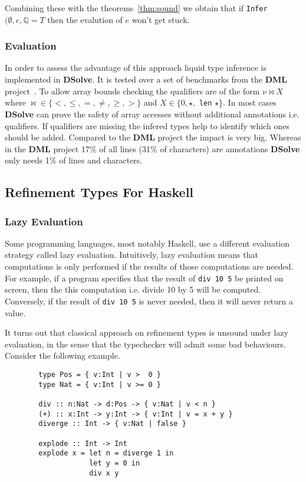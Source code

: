 \documentclass[a4paper,UKenglish]{lipics-v2016}
\begin{document}
Combining these with the theorems~\ref{thm:sound} we obtain that if \lstinline{Infer}$(\emptyset, e, \mathbb{Q} = T$ then the evalution of $e$ won't get stuck.

\subsubsection{Evaluation}

In order to assess the advantage of this approach liquid type inference is implemented in \textbf{DSolve}.
It is tested over a set of benchmarks from the \textbf{DML} project~\cite{Xi:1998:EAB}.
To allow array bounds checking the qualifiers are of the form $\nu \bowtie X$ where $\bowtie \in \{<, \le, =, \neq, \geq, >\}$ and $X \in \{0, \star,$ \lstinline{len} $\star$\}.
In most cases \textbf{DSolve} can prove the safety of array accesses without additional annotations i.e. qualifiers.
If qualifiers are missing the infered types help to identify which ones should be added.
Compared to the \textbf{DML} project the impact is very big.
Whereas in the \textbf{DML} project 17\% of all lines (31\% of characters) are annotations \textbf{DSolve} only needs 1\% of lines and characters.

  \subsection{Refinement Types For Haskell}

    \subsubsection{Lazy Evaluation}

      Some programming languages, most notably Haskell, use a different
      evaluation strategy called lazy evaluation.  Intuitively, lazy evaluation
      means that computations is only performed if the results of those
      computations are needed.  For example, if a program specifies that the
      result of \texttt{div 10 5} be printed on screen, then the this
      computation i.e. divide 10 by 5 will be computed.  Conversely, if the
      result of \texttt{div 10 5} is never needed, then it will never return a
      value.  

      It turns out that classical approach on refinement types is unsound under
      lazy evaluation, in the sense that the typechecker will admit some bad
      behaviours.  Consider the following example.
      \begin{verbatim}
        type Pos = { v:Int | v >  0 }
        type Nat = { v:Int | v >= 0 }

        div :: n:Nat -> d:Pos -> { v:Nat | v < n } 
        (+) :: x:Int -> y:Int -> { v:Int | v = x + y }
        diverge :: Int -> { v:Nat | false } 

        explode :: Int -> Int
        explode x = let n = diverge 1 in 
                    let y = 0 in 
                    div x y
      \end{verbatim}
\end{document}

